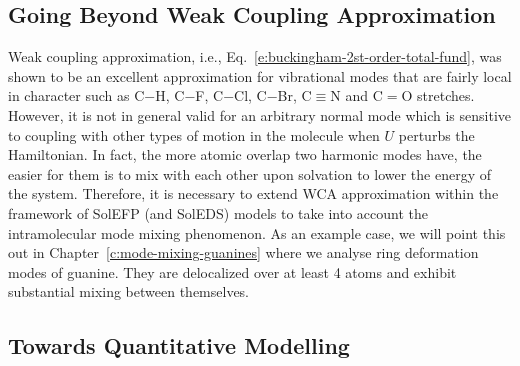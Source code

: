 \documentclass[b5paper,oneside,fleqn,11pt]{book}
\begin{document}
\begin{refsection}
\section{Going Beyond Weak Coupling Approximation\label{s:beyond-wca}}

Weak coupling approximation, i.e., Eq.~\eqref{e:buckingham-2st-order-total-fund},
was shown to be an excellent approximation
for vibrational modes that are fairly local in character
such as C$-$H, C$-$F, C$-$Cl, C$-$Br, C$\equiv$N and C$=$O stretches. However, it
is not in general valid for an arbitrary normal mode
which is sensitive to coupling with other types of motion
in the molecule when $U$ perturbs the Hamiltonian.
In fact, the more atomic overlap two harmonic modes have,
the easier for them is to mix with each other
upon solvation to lower the energy
of the system. 
Therefore, it is necessary to extend WCA approximation
within the framework of SolEFP (and SolEDS) models
to take into account the intramolecular mode mixing
phenomenon. As an example case, we will point this out
in Chapter~\ref{c:mode-mixing-guanines} 
where we analyse ring deformation modes
of guanine. They are delocalized over at least 4 atoms
and exhibit substantial mixing between themselves.

\subsection{Towards Quantitative Modelling}


\end{refsection}
\end{document}
